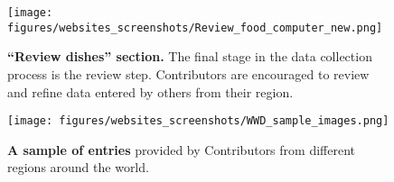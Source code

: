 \begin{figure}[H]
    \centering
    \texttt{[image: figures/websites\_screenshots/Review\_food\_computer\_new.png]}
    \caption{\textbf{``Review dishes'' section.} The final stage in the data collection process is the review step. Contributors are encouraged to review and refine data entered by others from their region.}
    \label{fig:food_review}
\end{figure}

\begin{figure}[H]
    \centering
    \texttt{[image: figures/websites\_screenshots/WWD\_sample\_images.png]}
    \caption{\textbf{A sample of entries} provided by Contributors from different regions around the world.}
    \label{fig:sample_image_dishes}
\end{figure}